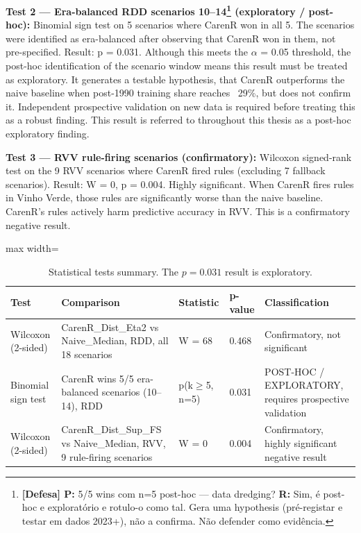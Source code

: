 \textbf{Test 2 --- Era-balanced RDD scenarios 10--14\footnote{\textbf{[Defesa] P:} 5/5 wins com n=5 post-hoc --- data dredging? \textbf{R:} Sim, é post-hoc e exploratório e rotulo-o como tal. Gera uma hypothesis (pré-registar e testar em dados 2023+), não a confirma. Não defender como evidência.} (exploratory / post-hoc): }Binomial sign test on 5 scenarios where CarenR won in all 5. The scenarios were identified as era-balanced after observing that CarenR won in them, not pre-specified. Result: p = 0.031. Although this meets the $\alpha$ = 0.05 threshold, the post-hoc identification of the scenario window means this result must be treated as exploratory. It generates a testable hypothesis, that CarenR outperforms the naive baseline when post-1990 training share reaches ~29\%, but does not confirm it. Independent prospective validation on new data is required before treating this as a robust finding. This result is referred to throughout this thesis as a post-hoc exploratory finding.

\textbf{Test 3 --- RVV rule-firing scenarios (confirmatory): }Wilcoxon signed-rank test on the 9 RVV scenarios where CarenR fired rules (excluding 7 fallback scenarios). Result: W = 0, p = 0.004. Highly significant. When CarenR fires rules in Vinho Verde, those rules are significantly worse than the naive baseline. CarenR's rules actively harm predictive accuracy in RVV. This is a confirmatory negative result.

\begin{table}[htbp]
  \centering
  \caption{Statistical tests summary. The $p=0.031$ result is exploratory.}\label{tab:ch5a_6}
  \small
  \begin{adjustbox}{max width=\textwidth}
    \begin{tabularx}{\textwidth}{p{2.2cm}|p{3.8cm}|p{1.6cm}|p{1.2cm}|X}
  \toprule
  Test & Comparison & Statistic & p-value & Classification \\
  \midrule
  Wilcoxon (2-sided) & CarenR\_Dist\_Eta2 vs Naive\_Median, RDD, all 18 scenarios & W = 68 & 0.468 & Confirmatory, not significant \\
  Binomial sign test & CarenR wins 5/5 era-balanced scenarios (10--14), RDD & p(k$\geq$5, n=5) & 0.031 & POST-HOC / EXPLORATORY, requires prospective validation \\
  Wilcoxon (2-sided) & CarenR\_Dist\_Sup\_FS vs Naive\_Median, RVV, 9 rule-firing scenarios & W = 0 & 0.004 & Confirmatory, highly significant negative result \\
  \bottomrule
\end{tabularx}
  \end{adjustbox}

\end{table}



